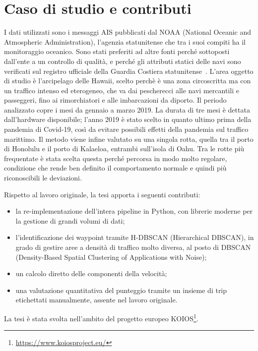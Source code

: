\section{Caso di studio e contributi}\label{sec:intro_case}

I dati utilizzati sono i messaggi AIS pubblicati dal NOAA (National Oceanic and Atmospheric Administration),
l'agenzia statunitense che tra i suoi compiti ha il monitoraggio oceanico.
Sono stati preferiti ad altre fonti perché sottoposti dall'ente a un controllo di qualità, e perché gli attributi
statici delle navi sono verificati sul registro ufficiale della Guardia Costiera statunitense~\cite{noaa_ais2019}.
L'area oggetto di studio è l'arcipelago delle Hawaii, scelto perchè è una zona circoscritta ma con un traffico intenso ed eterogeneo,
che va dai pescherecci alle navi mercantili e passeggeri, fino ai rimorchiatori e alle imbarcazioni da diporto.
Il periodo analizzato copre i mesi da gennaio a marzo 2019. La durata di tre mesi è dettata dall'hardware disponibile;
l'anno 2019 è stato scelto in quanto ultimo prima della pandemia di Covid-19, così da evitare possibili effetti
della pandemia sul traffico marittimo.
Il metodo viene infine valutato su una singola rotta, quella tra il porto di Honolulu e il porto di Kalaeloa,
entrambi sull'isola di Oahu. Tra le rotte più frequentate è stata scelta questa perché percorsa in modo molto
regolare, condizione che rende ben definito il comportamento normale e quindi più riconoscibili le deviazioni.

Rispetto al lavoro originale, la tesi apporta i seguenti contributi:
\begin{itemize}
    \item la re-implementazione dell'intera pipeline in Python, con librerie moderne per la gestione di grandi
          volumi di dati;
    \item l'identificazione dei waypoint tramite H-DBSCAN (Hierarchical DBSCAN), in grado di gestire aree a densità di traffico molto
          diversa, al posto di DBSCAN (Density-Based Spatial Clustering of Applications with Noise);
    \item un calcolo diretto delle componenti della velocità;
    \item una valutazione quantitativa del punteggio tramite un insieme di trip etichettati manualmente,
          assente nel lavoro originale.
\end{itemize}

La tesi è stata svolta nell'ambito del progetto europeo KOIOS\footnote{\url{https://www.koiosproject.eu/}}.

